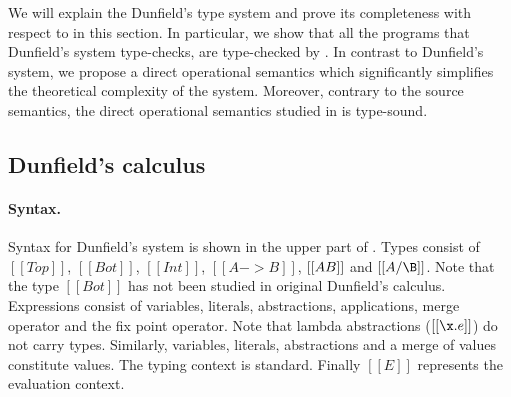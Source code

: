 We will explain the Dunfield's type system and prove its
completeness with respect to \namems in this section.
In particular, we show that all the programs that Dunfield's
system type-checks, are type-checked by \namems.
In contrast to Dunfield's system, we propose a direct
operational semantics which significantly simplifies the
theoretical complexity of the system.
Moreover, contrary to the \cite{dunfield2014elaborating}
source semantics, the direct operational semantics studied
in \namems is type-sound.




\subsection{Dunfield's calculus}

\paragraph{Syntax.}
Syntax for Dunfield's system is shown in the upper part 
of .
Types consist of $[[Top]]$, $[[Bot]]$, $[[Int]]$, $[[A->B]]$,
$[[A\/B]]$ and $[[A/\B]]$. Note that the type $[[Bot]]$
has not been studied
in original Dunfield's calculus.
Expressions consist of variables, literals, abstractions,
applications, merge operator and the fix point operator.
Note that lambda abstractions ($[[\x.e]]$) do not carry types.
Similarly, variables, literals, abstractions and a merge of
values constitute values. The typing context is standard.
Finally $[[E]]$ represents the evaluation context.



